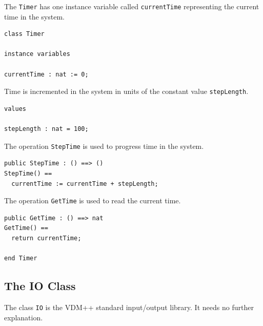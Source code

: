 \documentclass{overturerepchap}
\begin{document}
The \texttt{Timer} has one instance variable called
\texttt{currentTime} representing the current time in the system. 

\begin{lstlisting}
class Timer

instance variables

currentTime : nat := 0;
\end{lstlisting}

Time is incremented in the system in units of the constant value
\texttt{stepLength}.

\begin{lstlisting}
values

stepLength : nat = 100;
\end{lstlisting}

The operation \texttt{StepTime} is used to progress time in the system.

\begin{lstlisting}
public StepTime : () ==> ()
StepTime() ==
  currentTime := currentTime + stepLength;
\end{lstlisting}

The operation \texttt{GetTime} is used to read the current time.

\begin{lstlisting}
public GetTime : () ==> nat
GetTime() ==
  return currentTime;

end Timer
\end{lstlisting}

\subsection{The IO Class}

The class \texttt{IO} is the VDM++ standard input/output library. It
needs no further explanation.
\end{document}
